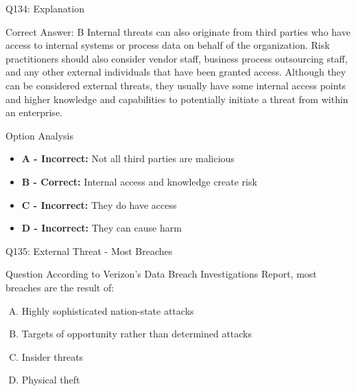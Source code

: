 \documentclass{beamer}
\begin{document}
	\begin{frame}{Q134: Explanation}
		\begin{block}{Correct Answer: B}
			Internal threats can also originate from third parties who have access to internal systems or process data on behalf of the organization. Risk practitioners should also consider vendor staff, business process outsourcing staff, and any other external individuals that have been granted access. Although they can be considered external threats, they usually have some internal access points and higher knowledge and capabilities to potentially initiate a threat from within an enterprise.
		\end{block}
		\begin{block}{Option Analysis}
			\begin{itemize}
				\item \textbf{A - Incorrect:} Not all third parties are malicious
				\item \textbf{B - Correct:} Internal access and knowledge create risk
				\item \textbf{C - Incorrect:} They do have access
				\item \textbf{D - Incorrect:} They can cause harm
			\end{itemize}
		\end{block}
	\end{frame}
	
	\begin{frame}{Q135: External Threat - Most Breaches}
		\begin{block}{Question}
			According to Verizon's Data Breach Investigations Report, most breaches are the result of:
		\end{block}
		\begin{enumerate}[(A)]
			\item Highly sophisticated nation-state attacks
			\item Targets of opportunity rather than determined attacks
			\item Insider threats
			\item Physical theft
		\end{enumerate}
	\end{frame}
	
\end{document}
